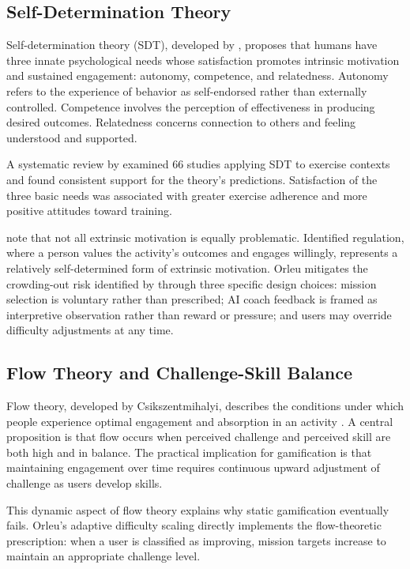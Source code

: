 \documentclass[12pt, a4paper]{report}
\begin{document}
\subsection{Self-Determination Theory}

Self-determination theory (SDT), developed by \citet{ryan2000}, proposes that humans have three innate psychological needs whose satisfaction promotes intrinsic motivation and sustained engagement: autonomy, competence, and relatedness. Autonomy refers to the experience of behavior as self-endorsed rather than externally controlled. Competence involves the perception of effectiveness in producing desired outcomes. Relatedness concerns connection to others and feeling understood and supported.

A systematic review by \citet{teixeira2012} examined 66 studies applying SDT to exercise contexts and found consistent support for the theory's predictions. Satisfaction of the three basic needs was associated with greater exercise adherence and more positive attitudes toward training.

\citet{deci2015} note that not all extrinsic motivation is equally problematic. Identified regulation, where a person values the activity's outcomes and engages willingly, represents a relatively self-determined form of extrinsic motivation. Orleu mitigates the crowding-out risk identified by \citet{mitchell2020} through three specific design choices: mission selection is voluntary rather than prescribed; AI coach feedback is framed as interpretive observation rather than reward or pressure; and users may override difficulty adjustments at any time.

\subsection{Flow Theory and Challenge-Skill Balance}

Flow theory, developed by Csikszentmihalyi, describes the conditions under which people experience optimal engagement and absorption in an activity \citep{nakamura2014}. A central proposition is that flow occurs when perceived challenge and perceived skill are both high and in balance. The practical implication for gamification is that maintaining engagement over time requires continuous upward adjustment of challenge as users develop skills.

This dynamic aspect of flow theory explains why static gamification eventually fails. Orleu's adaptive difficulty scaling directly implements the flow-theoretic prescription: when a user is classified as improving, mission targets increase to maintain an appropriate challenge level.
\end{document}
